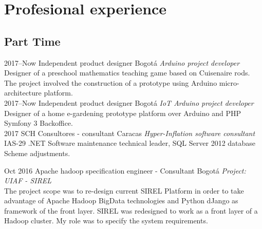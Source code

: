 \documentclass[]{friggeri-cv} %
\begin{document}

\section{Profesional experience}

\subsection{Part Time}

\begin{entrylist}


\entry
{2017--Now}
{Independent product designer}
{Bogotá}
{\emph{\textsuperscript{}Arduino project developer } \\
Designer of a preschool mathematics teaching game based on Cuisenaire rods. The project involved the construction of a prototype using Arduino micro-architecture platform.\\
}
\entry
{2017--Now}
{Independent product designer}
{Bogotá}
{\emph{\textsuperscript{}IoT Arduino project developer } \\
Designer of a home e-gardening prototype platform over Arduino and PHP Symfony 3 Backoffice.\\
}
\entry
{2017}
{SCH Consultores - consultant}
{Caracas}
{\emph{\textsuperscript{}Hyper-Inflation software consultant } \\
IAS-29 .NET Software maintenance technical leader, SQL Server 2012 database Scheme adjustments. \\
}
\newpage

\begin{entrylist}

\entry
{Oct 2016}
{Apache hadoop specification engineer - Consultant}
{Bogotá}
{\emph{Project: UIAF - SIREL} \\
The project scope was to re-design current SIREL Platform in order to take advantage of Apache Hadoop BigData technologies and Python dJango as framework of the front layer. SIREL was redesigned to work as a front layer of a Hadoop cluster. My role was to specify the system requirements.}


\end{entrylist}
\end{entrylist}
\end{document}
